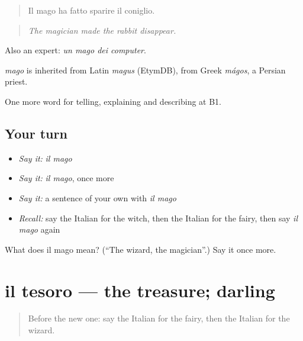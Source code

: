 \begin{quote}
Il mago ha fatto sparire il coniglio.
\end{quote}

\begin{quote}
\emph{The magician made the rabbit disappear.}
\end{quote}

Also an expert: \emph{un mago dei computer}.

\begin{cousinweb}
\emph{mago} is inherited from Latin \emph{magus} (EtymDB), from Greek \emph{mágos}, a Persian priest.
\end{cousinweb}

\begin{grammarlens}[title={What you've built}]
One more word for telling, explaining and describing at B1.
\end{grammarlens}

\subsection*{Your turn}
\begin{itemize}
\raggedright
  \item \emph{Say it:} \emph{il mago}
  \item \emph{Say it:} \emph{il mago}, once more
  \item \emph{Say it:} a sentence of your own with \emph{il mago}
  \item \emph{Recall:} say the Italian for the witch, then the Italian for the fairy, then say \emph{il mago} again
\end{itemize}

\begin{tcolorbox}[breakable,colback=teal!4,colframe=teal!35!black,title={Before you move on}]
What does il mago mean? (\textquotedblleft{}The wizard, the magician\textquotedblright{}.) Say it once more.
\end{tcolorbox}
\section[il tesoro]{il tesoro — the treasure; darling}

\label{lesson:IT-C326-tesoro}



\begin{quote}
Before the new one: say the Italian for the fairy, then the Italian for the wizard.
\end{quote}

